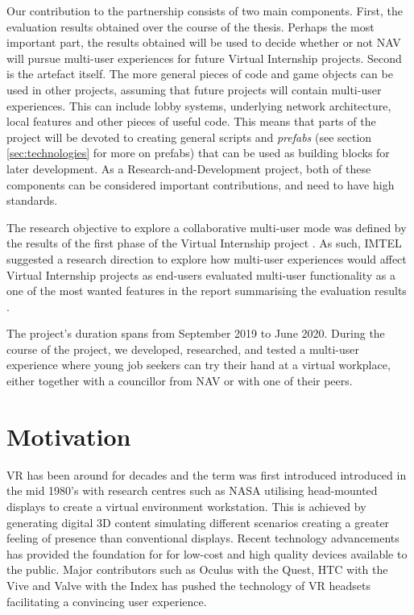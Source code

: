 
Our contribution to the partnership consists of two main components. First, the evaluation results obtained over the course of the thesis. Perhaps the most important part, the results obtained will be used to decide whether or not NAV will pursue multi-user experiences for future Virtual Internship projects. Second is the artefact itself. The more general pieces of code and game objects can be used in other projects, assuming that future projects will contain multi-user experiences. This can include lobby systems, underlying network architecture, local features and other pieces of useful code. This means that parts of the project will be devoted to creating general scripts and \textit{prefabs} (see section \ref{sec:technologies} for more on prefabs) that can be used as building blocks for later development. As a Research-and-Development project, both of these components can be considered important contributions, and need to have high standards.


The research objective to explore a collaborative multi-user mode was defined by the results of the first phase of the Virtual Internship project \cite{NavVRrapport}. As such, IMTEL suggested a research direction to explore how multi-user experiences would affect Virtual Internship projects as end-users evaluated multi-user functionality as a one of the most wanted features in the report summarising the evaluation results \cite{NavVRrapport}.    




The project's duration spans from September 2019 to June 2020. During the course of the project, we developed, researched, and tested a multi-user experience where young job seekers can try their hand at a virtual workplace, either together with a councillor from NAV or with one of their peers.

\section{Motivation}
VR has been around for decades and the term was first introduced introduced in the mid 1980's \cite{historyVR} with research centres such as NASA utilising head-mounted displays to create a virtual environment workstation. This is achieved by generating digital 3D content simulating different scenarios creating a greater feeling of presence than conventional displays. Recent technology advancements has provided the foundation for for low-cost and high quality devices available to the public. Major contributors such as Oculus with the Quest, HTC with the Vive and Valve with the Index has pushed the technology of VR headsets facilitating a convincing user experience.  

